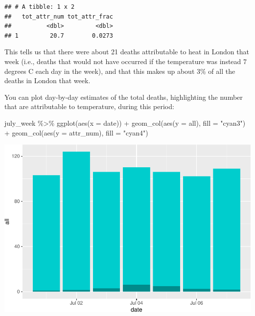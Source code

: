 \documentclass[
]{book}
\newenvironment{Shaded}{\begin{snugshade}}{\end{snugshade}}
\newcommand{\AttributeTok}[1]{\textcolor[rgb]{0.77,0.63,0.00}{#1}}
\newcommand{\FunctionTok}[1]{\textcolor[rgb]{0.00,0.00,0.00}{#1}}
\newcommand{\NormalTok}[1]{#1}
\newcommand{\SpecialCharTok}[1]{\textcolor[rgb]{0.00,0.00,0.00}{#1}}
\newcommand{\StringTok}[1]{\textcolor[rgb]{0.31,0.60,0.02}{#1}}
\begin{document}
\begin{verbatim}
## # A tibble: 1 x 2
##   tot_attr_num tot_attr_frac
##          <dbl>         <dbl>
## 1         20.7        0.0273
\end{verbatim}

This tells us that there were about 21 deaths attributable to heat in London that week (i.e., deaths that would not have occurred if the temperature was instead 7 degrees C each day in the week), and that this makes up about 3\% of all the deaths in London that week.

You can plot day-by-day estimates of the total deaths, highlighting the number that are attributable to temperature, during this period:

\begin{Shaded}
\begin{Highlighting}[]
\NormalTok{july\_week }\SpecialCharTok{\%\textgreater{}\%} 
  \FunctionTok{ggplot}\NormalTok{(}\FunctionTok{aes}\NormalTok{(}\AttributeTok{x =}\NormalTok{ date)) }\SpecialCharTok{+} 
  \FunctionTok{geom\_col}\NormalTok{(}\FunctionTok{aes}\NormalTok{(}\AttributeTok{y =}\NormalTok{ all), }\AttributeTok{fill =} \StringTok{"cyan3"}\NormalTok{) }\SpecialCharTok{+} 
  \FunctionTok{geom\_col}\NormalTok{(}\FunctionTok{aes}\NormalTok{(}\AttributeTok{y =}\NormalTok{ attr\_num), }\AttributeTok{fill =} \StringTok{"cyan4"}\NormalTok{)}
\end{Highlighting}
\end{Shaded}

\includegraphics{adv_epi_analysis_files/figure-latex/unnamed-chunk-151-1.pdf}
\end{document}

